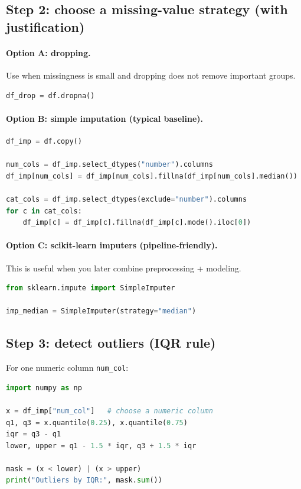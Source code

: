 \documentclass[11pt]{article}
\begin{document}
\subsection{Step 2: choose a missing-value strategy (with justification)}
\paragraph{Option A: dropping.}
Use when missingness is small and dropping does not remove important groups.
\begin{lstlisting}[language=Python]
df_drop = df.dropna()
\end{lstlisting}

\paragraph{Option B: simple imputation (typical baseline).}
\begin{lstlisting}[language=Python]
df_imp = df.copy()

num_cols = df_imp.select_dtypes("number").columns
df_imp[num_cols] = df_imp[num_cols].fillna(df_imp[num_cols].median())

cat_cols = df_imp.select_dtypes(exclude="number").columns
for c in cat_cols:
    df_imp[c] = df_imp[c].fillna(df_imp[c].mode().iloc[0])
\end{lstlisting}

\paragraph{Option C: scikit-learn imputers (pipeline-friendly).}
This is useful when you later combine preprocessing + modeling.
\begin{lstlisting}[language=Python]
from sklearn.impute import SimpleImputer

imp_median = SimpleImputer(strategy="median")
\end{lstlisting}

\subsection{Step 3: detect outliers (IQR rule)}
For one numeric column \texttt{num\_col}:
\begin{lstlisting}[language=Python]
import numpy as np

x = df_imp["num_col"]   # choose a numeric column
q1, q3 = x.quantile(0.25), x.quantile(0.75)
iqr = q3 - q1
lower, upper = q1 - 1.5 * iqr, q3 + 1.5 * iqr

mask = (x < lower) | (x > upper)
print("Outliers by IQR:", mask.sum())
\end{lstlisting}
\end{document}
